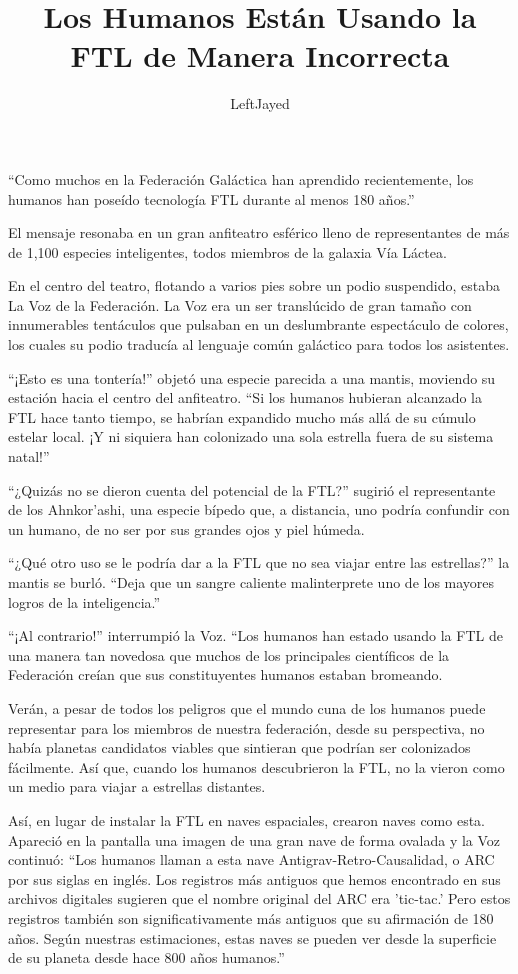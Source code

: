 \documentclass[spanish,12pt,a4paper,twoside,titlepage]{book}
\title{Los Humanos Están Usando la FTL de Manera Incorrecta}
\author{LeftJayed}
\begin{document}
    \maketitle

    ``Como muchos en la Federación Galáctica han aprendido recientemente, los humanos han poseído tecnología FTL durante al menos 180 años.''

    El mensaje resonaba en un gran anfiteatro esférico lleno de representantes de más de 1,100 especies inteligentes, todos miembros de la galaxia Vía Láctea.

    En el centro del teatro, flotando a varios pies sobre un podio suspendido, estaba La Voz de la Federación. La Voz era un ser translúcido de gran tamaño con innumerables tentáculos que pulsaban en un deslumbrante espectáculo de colores, los cuales su podio traducía al lenguaje común galáctico para todos los asistentes.

    ``¡Esto es una tontería!'' objetó una especie parecida a una mantis, moviendo su estación hacia el centro del anfiteatro. ``Si los humanos hubieran alcanzado la FTL hace tanto tiempo, se habrían expandido mucho más allá de su cúmulo estelar local. ¡Y ni siquiera han colonizado una sola estrella fuera de su sistema natal!''

    ``¿Quizás no se dieron cuenta del potencial de la FTL?'' sugirió el representante de los Ahnkor'ashi, una especie bípedo que, a distancia, uno podría confundir con un humano, de no ser por sus grandes ojos y piel húmeda.

    ``¿Qué otro uso se le podría dar a la FTL que no sea viajar entre las estrellas?'' la mantis se burló. ``Deja que un sangre caliente malinterprete uno de los mayores logros de la inteligencia.''

    ``¡Al contrario!'' interrumpió la Voz. ``Los humanos han estado usando la FTL de una manera tan novedosa que muchos de los principales científicos de la Federación creían que sus constituyentes humanos estaban bromeando.

    Verán, a pesar de todos los peligros que el mundo cuna de los humanos puede representar para los miembros de nuestra federación, desde su perspectiva, no había planetas candidatos viables que sintieran que podrían ser colonizados fácilmente. Así que, cuando los humanos descubrieron la FTL, no la vieron como un medio para viajar a estrellas distantes.

    Así, en lugar de instalar la FTL en naves espaciales, crearon naves como esta. Apareció en la pantalla una imagen de una gran nave de forma ovalada y la Voz continuó: ``Los humanos llaman a esta nave Antigrav-Retro-Causalidad, o ARC por sus siglas en inglés. Los registros más antiguos que hemos encontrado en sus archivos digitales sugieren que el nombre original del ARC era 'tic-tac.' Pero estos registros también son significativamente más antiguos que su afirmación de 180 años. Según nuestras estimaciones, estas naves se pueden ver desde la superficie de su planeta desde hace 800 años humanos.''
\end{document}
